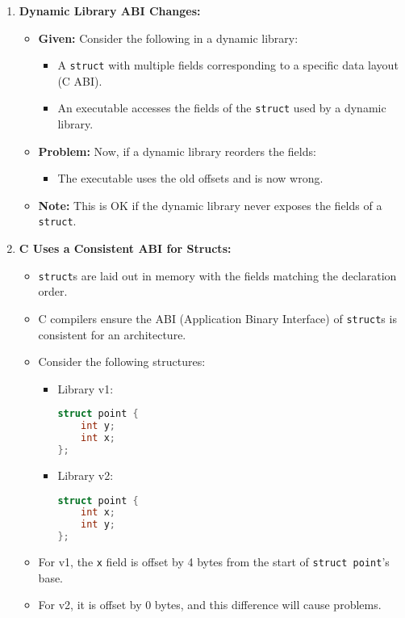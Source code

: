 \begin{example}
    \begin{enumerate}
        \item \textbf{Dynamic Library ABI Changes:}
        \begin{itemize}
            \item \textbf{Given:} Consider the following in a dynamic library:
            \begin{itemize}
                \item A \texttt{struct} with multiple fields corresponding to a specific data layout (C ABI).
                \item An executable accesses the fields of the \texttt{struct} used by a dynamic library.
            \end{itemize}
            \item \textbf{Problem:} Now, if a dynamic library reorders the fields:
            \begin{itemize}
                \item The executable uses the old offsets and is now wrong.
            \end{itemize}
            \item \textbf{Note:} This is OK if the dynamic library never exposes the fields of a \texttt{struct}.
        \end{itemize}
    
        \item \textbf{C Uses a Consistent ABI for Structs:}
        \begin{itemize}
            \item \texttt{struct}s are laid out in memory with the fields matching the declaration order.
            \item C compilers ensure the ABI (Application Binary Interface) of \texttt{struct}s is consistent for an architecture.
            \item Consider the following structures:
            \begin{itemize}
                \item Library v1:
        \begin{lstlisting}[language=C]
struct point {
    int y;
    int x;
};
        \end{lstlisting}
        \item Library v2:
        \begin{lstlisting}[language=C]
struct point {
    int x;
    int y;
};
            \end{lstlisting}
            \end{itemize}
            \item For v1, the \texttt{x} field is offset by 4 bytes from the start of \texttt{struct point}'s base.
            \item For v2, it is offset by 0 bytes, and this difference will cause problems.
        \end{itemize}
    

\end{enumerate}
\end{example}
